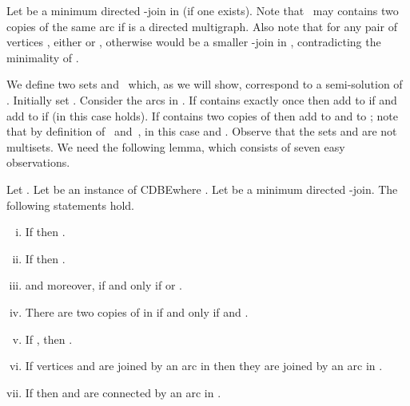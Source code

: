 \documentclass[11pt]{llncs}
\newcommand{\cdbe}{{\sc CDBE}}
\begin{document}
Let  be a minimum directed
-join in  (if one exists).  Note that~ may contains two copies of
the same arc if  is a directed multigraph.  
Also note that for any pair of vertices
, either  or , otherwise  would be a smaller -join in , contradicting the
minimality of . 

We define two sets  and~ which, as we will show, correspond to a
semi-solution  of .  Initially set .
Consider the arcs in .   
If  contains  exactly once then add  to  
 if  and add  to  if  (in this case  holds).
If  contains two copies of  then add  to  and  to ;
note that by definition of~ and~, in this case  and .
Observe that the sets  and  are not multisets.
We need the following lemma, which consists of seven 
easy observations.

\begin{lemma}\label{l-weakly}
\begin{sloppypar}
Let .  Let  be an
instance of \cdbe where .  Let  be a minimum directed
-join. The following statements hold.
\end{sloppypar}
\begin{enumerate}[(i)]
\renewcommand{\theenumi}{(\roman{enumi})}
\renewcommand\labelenumi{\theenumi}
\item \label{stat:uv-A-uv-not-E} If  then .
\item \label{stat:uv-D-uv-E} If  then .
\item \label{stat:A-D-disjoint}  and moreover,  if and only if  or . 
\item \label{stat:two-copies-F} There are two copies of  in  if and only if  and .
\item \label{stat:no-ed-D-empty} If , then .
\item \label{stat:never-disconnect} If vertices  and  are joined by an arc in  then they are
joined by an arc in .
\item \label{stat:never-disconnect-changed} If  then  and  are connected by an arc in .
\end{enumerate}
\end{lemma}
\end{document}
